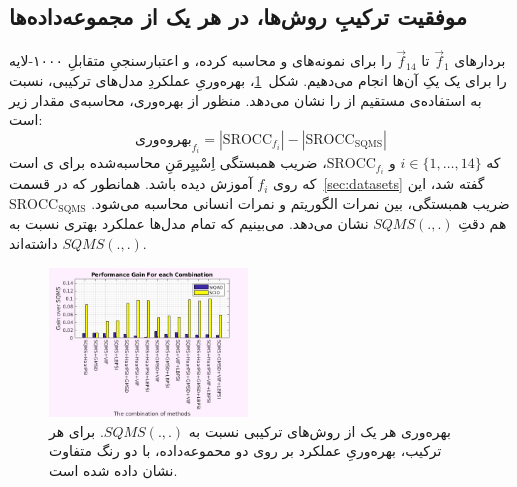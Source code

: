 \documentclass[twocolumn]{article}
\begin{document}
\subsection{موفقیت ترکیبِ روش‌ها، در هر یک از مجموعه‌داده‌ها} \label{sec:per_dataset}
بردارهای $\vec{f}_1$ تا $\vec{f}_{14}$ را برای نمونه‌های  و  محاسبه کرده، و اعتبارسنجیِ متقابلِ ۱۰۰۰-لایه را برای یک یکِ آن‌ها انجام می‌دهیم. شکل~\ref{fig:res_per_dataset}، بهره‌وریِ عملکردِ مدل‌های ترکیبی، نسبت به استفاده‌ی مستقیم از  را نشان می‌دهد. منظور از بهره‌وری، محاسبه‌ی مقدار زیر است:
\begin{equation}
	\text{بهروه‌وری}_{f_i}= |\text{SROCC}_{f_i}|-|\text{SROCC}_{\text{SQMS}}|
	\label{eq:gain}
\end{equation}
که $i\in\{1, \ldots, 14\}$ و $\text{SROCC}_{f_i}$، ضریب همبستگی اِسْپیِرمَنِ محاسبه‌شده برای ی است که روی $f_i$ آموزش دیده باشد. همانطور که در قسمت~\ref{sec:datasets} گفته شد، این ضریب همبستگی، بین نمرات الگوریتم و نمرات انسانی محاسبه می‌شود. $\text{SROCC}_{\text{SQMS}}$ هم دقتِ $SQMS(.,.)$ نشان می‌دهد. می‌بینیم که تمام مدل‌ها عملکرد بهتری نسبت به $SQMS(., .)$ داشته‌اند.
\begin{figure}
	\begin{center}
	\includegraphics[width=0.47\textwidth]{per_dataset}
	\end{center}
	\caption{بهره‌وری هر یک از روش‌های ترکیبی نسبت به $SQMS(., .)$. برای هر ترکیب، بهره‌وریِ عملکرد بر روی دو محموعه‌داده، با دو رنگ متفاوت نشان داده شده است.}
	\label{fig:res_per_dataset}
\end{figure}
\end{document}
